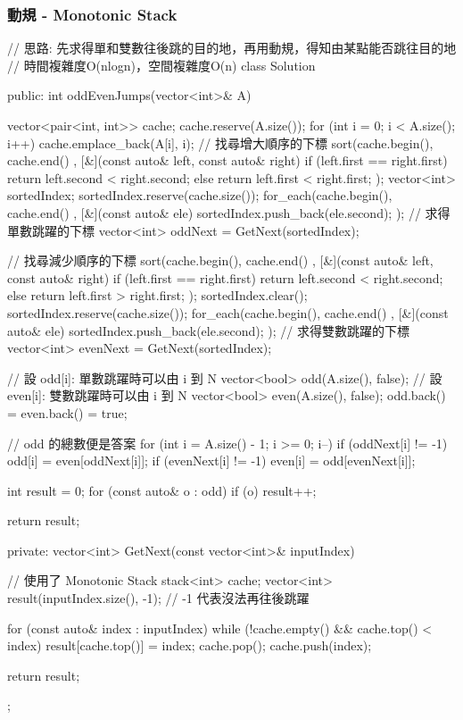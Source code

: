 \subsubsection{動規 - Monotonic Stack}
\begin{Code}
// 思路: 先求得單和雙數往後跳的目的地，再用動規，得知由某點能否跳往目的地
// 時間複雜度O(nlogn)，空間複雜度O(n)
class Solution {
public:
    int oddEvenJumps(vector<int>& A) {
        vector<pair<int, int>> cache; cache.reserve(A.size());
        for (int i = 0; i < A.size(); i++)
            cache.emplace_back(A[i], i);
        // 找尋增大順序的下標
        sort(cache.begin(), cache.end()
             , [&](const auto& left, const auto& right)
             {
                 if (left.first == right.first)
                     return left.second < right.second;
                 else
                     return left.first < right.first;
             });
        vector<int> sortedIndex;
        sortedIndex.reserve(cache.size());
        for_each(cache.begin(), cache.end()
                , [&](const auto& ele) { sortedIndex.push_back(ele.second); } );
        // 求得單數跳躍的下標
        vector<int> oddNext = GetNext(sortedIndex);

        // 找尋減少順序的下標
        sort(cache.begin(), cache.end()
             , [&](const auto& left, const auto& right)
             {
                 if (left.first == right.first)
                     return left.second < right.second;
                 else
                     return left.first > right.first;
             });
        sortedIndex.clear();
        sortedIndex.reserve(cache.size());
        for_each(cache.begin(), cache.end()
                , [&](const auto& ele) { sortedIndex.push_back(ele.second); } );
        // 求得雙數跳躍的下標
        vector<int> evenNext = GetNext(sortedIndex);

        // 設 odd[i]: 單數跳躍時可以由 i 到 N
        vector<bool> odd(A.size(), false);
        // 設 even[i]: 雙數跳躍時可以由 i 到 N
        vector<bool> even(A.size(), false);
        odd.back() = even.back() = true;

        // odd 的總數便是答案
        for (int i = A.size() - 1; i >= 0; i--)
        {
            if (oddNext[i] != -1)
                odd[i] = even[oddNext[i]];
            if (evenNext[i] != -1)
                even[i] = odd[evenNext[i]];
        }

        int result = 0;
        for (const auto& o : odd)
            if (o) result++;

        return result;
    }
private:
    vector<int> GetNext(const vector<int>& inputIndex)
    {
        // 使用了 Monotonic Stack
        stack<int> cache;
        vector<int> result(inputIndex.size(), -1); // -1 代表沒法再往後跳躍

        for (const auto& index : inputIndex)
        {
            while (!cache.empty() && cache.top() < index)
            {
                result[cache.top()] = index;
                cache.pop();
            }
            cache.push(index);
        }

        return result;
    }
};
\end{Code}

